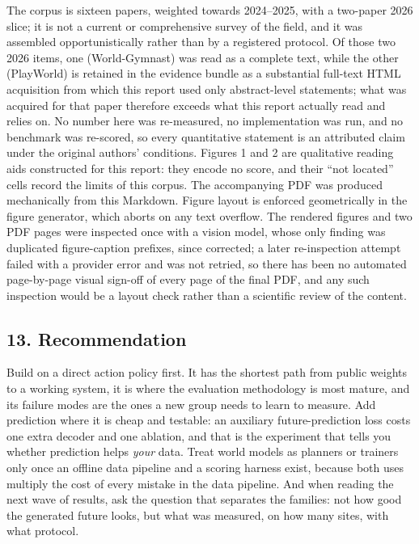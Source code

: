 \documentclass[
  10pt,
  english,
]{article}
\begin{document}
The corpus is sixteen papers, weighted towards 2024--2025, with a
two-paper 2026 slice; it is not a current or comprehensive survey of the
field, and it was assembled opportunistically rather than by a
registered protocol. Of those two 2026 items, one (World-Gymnast) was
read as a complete text, while the other (PlayWorld) is retained in the
evidence bundle as a substantial full-text HTML acquisition from which
this report used only abstract-level statements; what was acquired for
that paper therefore exceeds what this report actually read and relies
on. No number here was re-measured, no implementation was run, and no
benchmark was re-scored, so every quantitative statement is an
attributed claim under the original authors' conditions. Figures 1 and 2
are qualitative reading aids constructed for this report: they encode no
score, and their ``not located'' cells record the limits of this corpus.
The accompanying PDF was produced mechanically from this Markdown.
Figure layout is enforced geometrically in the figure generator, which
aborts on any text overflow. The rendered figures and two PDF pages were
inspected once with a vision model, whose only finding was duplicated
figure-caption prefixes, since corrected; a later re-inspection attempt
failed with a provider error and was not retried, so there has been no
automated page-by-page visual sign-off of every page of the final PDF,
and any such inspection would be a layout check rather than a scientific
review of the content.

\hypertarget{recommendation}{%
\subsection{13. Recommendation}\label{recommendation}}

Build on a direct action policy first. It has the shortest path from
public weights to a working system, it is where the evaluation
methodology is most mature, and its failure modes are the ones a new
group needs to learn to measure. Add prediction where it is cheap and
testable: an auxiliary future-prediction loss costs one extra decoder
and one ablation, and that is the experiment that tells you whether
prediction helps \emph{your} data. Treat world models as planners or
trainers only once an offline data pipeline and a scoring harness exist,
because both uses multiply the cost of every mistake in the data
pipeline. And when reading the next wave of results, ask the question
that separates the families: not how good the generated future looks,
but what was measured, on how many sites, with what protocol.

  
\end{document}
